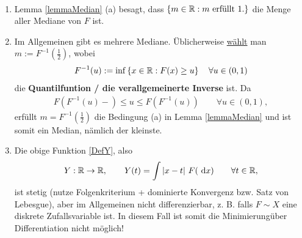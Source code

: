 \begin{bemerkungnr}\
\begin{enumerate}
\item Lemma \ref{lemmaMedian} (a) besagt, dass $\lbrace m\in\mathbb{R}: m\text{ erfüllt } 1.\rbrace$ die Menge aller Mediane von $F$ ist.
\item Im Allgemeinen gibt es mehrere Mediane. Üblicherweise \underline{wählt} man $m:=F^{-1}(\frac{1}{2})$, wobei
\begin{align*}
F^{-1}(u):=\inf\left\lbrace x\in\mathbb{R}:F(x)\geq u\right\rbrace\quad\forall u\in (0,1)
\end{align*}
die \textbf{Quantilfuntion / die verallgemeinerte Inverse} ist. Da
\begin{align*}
F\left(F^{-1}(u)-\right)\leq u\leq F\left(F^{-1}(u)\right)\qquad\forall u\in (0,1),
\end{align*}
erfüllt $m=F^{-1}\left(\frac{1}{2}\right)$ die Bedingung (a) in Lemma \ref{lemmaMedian} und ist somit ein Median, nämlich der kleinste.
\item Die obige Funktion \eqref{DefY}, also
\begin{align*}
Y:\mathbb{R}\to\mathbb{R},\qquad Y(t)=\int\limits|x-t|~F(\text{ d} x)\qquad\forall t\in\mathbb{R},
\end{align*}
ist stetig (nutze Folgenkriterium + dominierte Konvergenz bzw. Satz von Lebesgue), aber im Allgemeinen nicht differenzierbar, z. B. falls $F\sim X$ eine diskrete Zufallsvariable ist. In diesem Fall ist somit die Minimierungüber Differentiation nicht möglich!
\end{enumerate}
\end{bemerkungnr}
